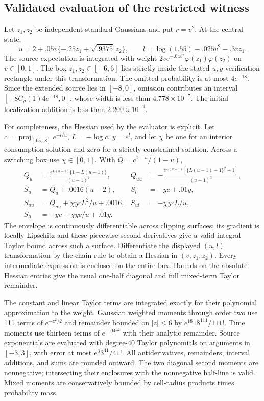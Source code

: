 \subsection{Validated evaluation of the restricted witness}
Let $z_1,z_2$ be independent standard Gaussians and put $r=v^2$. At the central state,
\[
 u=2+.05v\{- .25z_1+\sqrt{.9375}\,z_2\},\qquad
 l=\log(1.55)-.025v^2-.3vz_1.
\]
The source expectation is integrated with weight $2ve^{-.04v^2}\varphi(z_1)\varphi(z_2)$ on $v\in[0,1]$. The box $z_1,z_2\in[-6,6]$ lies strictly inside the stated $u,y$ verification rectangle under this transformation. The omitted probability is at most $4e^{-18}$. Since the extended source lies in $[-8,0]$, omission contributes an interval $[-8C_\rho(1)4e^{-18},0]$, whose width is less than $4.778\times10^{-7}$. The initial localization addition is less than $2.200\times10^{-9}$.

For completeness, the Hessian used by the evaluator is explicit. Let $c=\operatorname{proj}_{[.05,.8]}e^{-l/u}$, $L=-\log c$, $y=e^l$, and let $\chi$ be one for an interior consumption solution and zero for a strictly constrained solution. Across a switching box use $\chi\in[0,1]$. With $Q=c^{1-u}/(1-u)$,
\begin{align*}
 Q_u&=\frac{e^{L(u-1)}\{1-L(u-1)\}}{(u-1)^2},&
 Q_{uu}&=-\frac{e^{L(u-1)}[\{L(u-1)-1\}^2+1]}{(u-1)^3},\\
 S_u&=Q_u+.0016(u-2),&S_l&=-yc+.01y,\\
 S_{uu}&=Q_{uu}+\chi ycL^2/u+.0016,&S_{ul}&=-\chi ycL/u,\\
 S_{ll}&=-yc+\chi yc/u+.01y.&&
\end{align*}
The envelope is continuously differentiable across clipping surfaces; its gradient is locally Lipschitz and these piecewise second derivatives give a valid integral Taylor bound across such a surface. Differentiate the displayed $(u,l)$ transformation by the chain rule to obtain a Hessian in $(v,z_1,z_2)$. Every intermediate expression is enclosed on the entire box. Bounds on the absolute Hessian entries give the usual one-half diagonal and full mixed-term Taylor remainder.

The constant and linear Taylor terms are integrated exactly for their polynomial approximation to the weight. Gaussian weighted moments through order two use 111 terms of $e^{-z^2/2}$ and remainder bounded on $|z|\leq6$ by $e^{18}18^{111}/111!$. Time moments use thirteen terms of $e^{-.04v^2}$ with their analytic remainder. Source exponentials are evaluated with degree-40 Taylor polynomials on arguments in $[-3,3]$, with error at most $e^3 3^{41}/41!$. All antiderivatives, remainders, interval additions, and sums are rounded outward. The two diagonal second moments are nonnegative; intersecting their enclosures with the nonnegative half-line is valid. Mixed moments are conservatively bounded by cell-radius products times probability mass.

